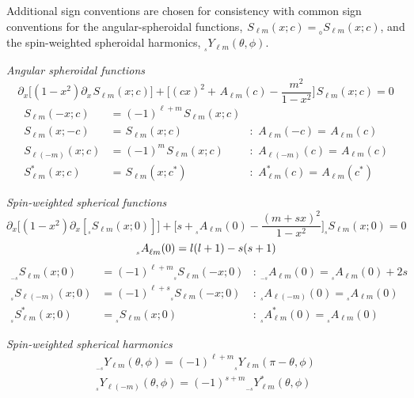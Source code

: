 \documentclass[11pt]{article}
\newcommand{\swY}[4][]{{}_{{}_{#2}}\!Y^{#1}_{#3}(#4)}
\newcommand{\swS}[5][]{{}_{{}_{#2}}S^{#1}_{#3}(#4;#5)}
\newcommand{\scA}[4][]{{}_{{}_{#2}}A^{#1}_{#3}(#4)}
\begin{document}
Additional sign conventions are chosen for consistency with common
sign conventions for the angular-spheroidal functions,
$\swS{}{\ell{m}}{x}{c} = \swS{0}{\ell{m}}{x}{c}$, and the spin-weighted spheroidal harmonics, $\swY{s}{\ell{m}}{\theta,\phi}$.

\vspace{0.25in}
\noindent
{\it Angular spheroidal functions}
\begin{equation}
\partial_x \Big[ (1-x^2)\partial_x \swS{}{\ell{m}}{x}{c}\Big] + \bigg[(cx)^2 + \scA{}{\ell{m}}{c} - \frac{m^2}{1-x^2}\bigg]\swS{}{\ell{m}}{x}{c} = 0
\end{equation}
\begin{align}
\swS{}{\ell{m}}{-x}{c} &= (-1)^{\ell+m}\swS{}{\ell{m}}{x}{c}& \\
\swS{}{\ell{m}}{x}{-c} &= \swS{}{\ell{m}}{x}{c} 
           &:\ \scA{}{\ell{m}}{-c} = \scA{}{\ell{m}}{c} \\
\swS{}{\ell(-m)}{x}{c} &= (-1)^m\swS{}{\ell{m}}{x}{c} 
           &:\ \scA{}{\ell(-m)}{c} = \scA{}{\ell{m}}{c} \\
\swS[*]{}{\ell{m}}{x}{c} &= \swS{}{\ell{m}}{x}{c^*} 
           &:\ \scA[*]{}{\ell{m}}{c} = \scA{}{\ell{m}}{c^*}
\end{align}

\noindent
{\it Spin-weighted spherical functions}
\begin{equation}
\partial_x \Big[ (1-x^2)\partial_x [\swS{s}{\ell{m}}{x}{0}]\Big] + \bigg[s + \scA{s}{\ell{m}}{0} - \frac{(m+sx)^2}{1-x^2}\bigg]\swS{s}{\ell{m}}{x}{0} = 0
\end{equation}
\begin{equation}
\scA{s}{\ell{m}}{0} = l(l+1) - s(s+1)\\
\end{equation}
\begin{align}
\swS{-s}{\ell{m}}{x}{0} &= (-1)^{\ell+m}\swS{s}{\ell{m}}{-x}{0} 
           &:\ \scA{-s}{\ell{m}}{0} = \scA{s}{\ell{m}}{0} + 2s \\
\swS{s}{\ell(-m)}{x}{0} &= (-1)^{\ell+s}\swS{s}{\ell{m}}{-x}{0} 
           &:\ \scA{s}{\ell(-m)}{0} = \scA{s}{\ell{m}}{0} \\
\swS[*]{s}{\ell{m}}{x}{0} &= \swS{s}{\ell{m}}{x}{0} 
           &:\ \scA[*]{s}{\ell{m}}{0} = \scA{s}{\ell{m}}{0}
\end{align}

\noindent
{\it Spin-weighted spherical harmonics}
\begin{align}\label{eqn:swYminuss}
\swY{-s}{\ell{m}}{\theta,\phi}=(-1)^{\ell+m}\swY{s}{\ell{m}}{\pi-\theta,\phi} \\ \label{eqn:swYminusm}
\swY{s}{\ell(-m)}{\theta,\phi}=(-1)^{s+m}\swY[*]{-s}{\ell{m}}{\theta,\phi}
\end{align}
\end{document}
